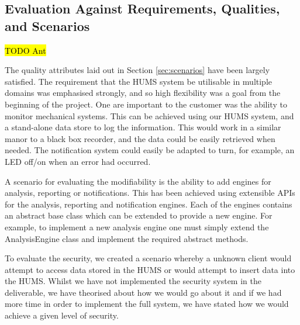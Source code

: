 \documentclass[10pt,a4paper]{article}
\begin{document}
\subsection{Evaluation Against Requirements, Qualities, and Scenarios}
\label{sec:req_eval}
\hl{TODO Ant}


The quality attributes laid out in Section \ref{sec:scenarios} have been largely satisfied. The requirement that the HUMS system be utilisable in multiple domains was emphasised strongly, and so high flexibility was a goal from the beginning of the project. One are important to the customer was the ability to monitor mechanical systems. This can be achieved using our HUMS system, and a stand-alone data store to log the information. This would work in a similar manor to a black box recorder, and the data could be easily retrieved when needed. The notification system could easily be adapted to turn, for example, an LED off/on when an error had occurred.

A scenario for evaluating the modifiability is the ability to add engines for analysis, reporting or notifications. This has been achieved using extensible APIs for the analysis, reporting and notification engines. Each of the engines contains an abstract base class which can be extended to provide a new engine. For example, to implement a new analysis engine one must simply extend the AnalysisEngine class and implement the required abstract methods.

To evaluate the security, we created a scenario whereby a unknown client would attempt to access data stored in the HUMS or would attempt to insert data into the HUMS. Whilst we have not implemented the security system in the deliverable, we have theorised about how we would go about it and if we had more time in order to implement the full system, we have stated how we would achieve a given level of security.
\end{document}
